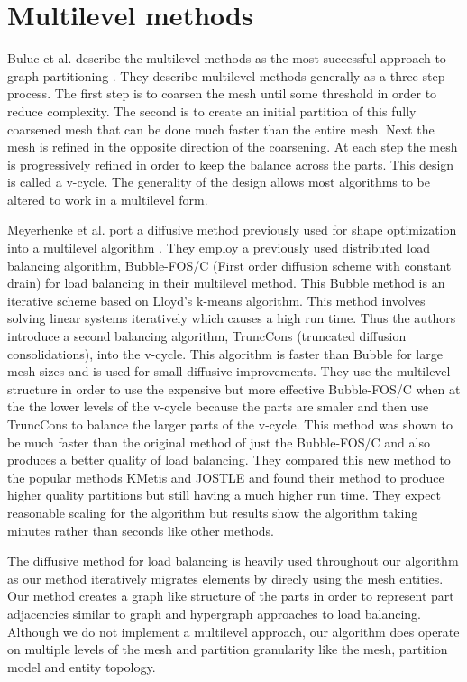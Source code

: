 \documentclass{thesis}
\begin{document}
\section{Multilevel methods}
Buluc et al. describe the multilevel methods as the most successful approach to 
graph partitioning \cite{surveygraph}. They describe multilevel methods 
generally as a three step process. The first step is to coarsen the mesh 
until some threshold in order to reduce complexity. The second is to create 
an initial partition of this fully coarsened mesh that can be done much 
faster than the entire mesh. Next the mesh is refined in the opposite direction
of the coarsening. At each step the mesh is progressively refined in order to
keep the balance across the parts. This design is called a v-cycle. The 
generality of the design allows most algorithms to be altered to work in a 
multilevel form. 

Meyerhenke et al. port a diffusive method previously used for 
shape optimization into a multilevel algorithm \cite{multidiffuse}. They 
employ a 
previously used distributed load balancing algorithm, Bubble-FOS/C (First order
diffusion scheme with constant drain) for load balancing in their multilevel
method. This Bubble method is an iterative scheme based on Lloyd's k-means 
algorithm. This method involves solving linear systems iteratively which causes 
a high run time. Thus the authors introduce a second balancing algorithm, 
TruncCons (truncated diffusion consolidations), into the v-cycle. This 
algorithm is faster than Bubble for large mesh sizes and is used for small
diffusive improvements. They use the multilevel structure in order to use 
the expensive but more effective Bubble-FOS/C when at the the lower levels of 
the v-cycle because the parts are smaler and then use TruncCons to balance the 
larger parts of the v-cycle. 
This method was shown to be much faster than the original method 
of just the Bubble-FOS/C and also produces a better quality of load balancing. 
They compared this new method to the popular methods KMetis and JOSTLE and 
found their method to produce higher quality partitions but still having a
much higher run time. They expect reasonable scaling for the algorithm but 
results show the algorithm taking minutes rather than seconds like other 
methods.

The diffusive method for load balancing is heavily used throughout our 
algorithm as our method iteratively migrates elements by direcly using the 
mesh entities. Our method creates a graph like structure of the parts in 
order to represent part adjacencies similar to graph and hypergraph approaches 
to load balancing. Although we do not implement a multilevel approach, our 
algorithm does operate on multiple levels of the mesh and partition 
granularity like the mesh, partition model and entity topology.
\end{document}
